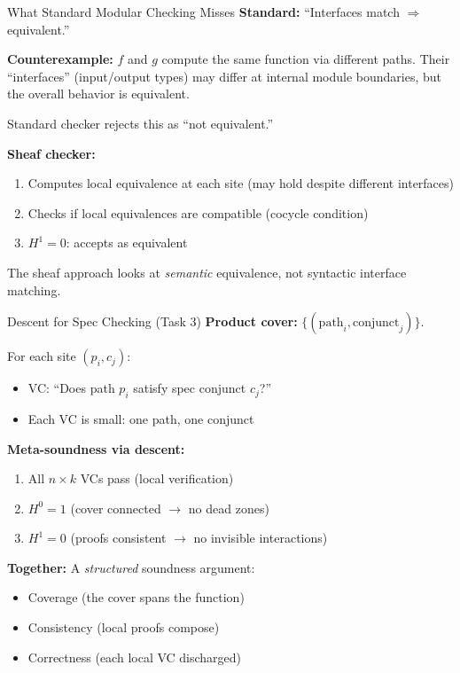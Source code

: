 \documentclass[aspectratio=169,10pt]{beamer}
\begin{document}
\begin{frame}{What Standard Modular Checking Misses}
\textbf{Standard:} ``Interfaces match $\Rightarrow$ equivalent.''

\textbf{Counterexample:} $f$ and $g$ compute the same function via different paths. Their ``interfaces'' (input/output types) may differ at internal module boundaries, but the overall behavior is equivalent.

\vspace{0.3em}
Standard checker rejects this as ``not equivalent.''

\vspace{0.3em}
\textbf{Sheaf checker:}
\begin{enumerate}
  \item Computes local equivalence at each site (may hold despite different interfaces)
  \item Checks if local equivalences are compatible (cocycle condition)
  \item $H^1 = 0$: accepts as equivalent
\end{enumerate}

The sheaf approach looks at \emph{semantic} equivalence, not syntactic interface matching.
\end{frame}

\begin{frame}{Descent for Spec Checking (Task 3)}
\textbf{Product cover:} $\{(\text{path}_i, \text{conjunct}_j)\}$.

For each site $(p_i, c_j)$:
\begin{itemize}
  \item VC: ``Does path $p_i$ satisfy spec conjunct $c_j$?''
  \item Each VC is small: one path, one conjunct
\end{itemize}

\textbf{Meta-soundness via descent:}
\begin{enumerate}
  \item All $n \times k$ VCs pass (local verification)
  \item $H^0 = 1$ (cover connected $\to$ no dead zones)
  \item $H^1 = 0$ (proofs consistent $\to$ no invisible interactions)
\end{enumerate}

\textbf{Together:} A \emph{structured} soundness argument:
\begin{itemize}
  \item Coverage (the cover spans the function)
  \item Consistency (local proofs compose)
  \item Correctness (each local VC discharged)
\end{itemize}
\end{frame}
\end{document}
